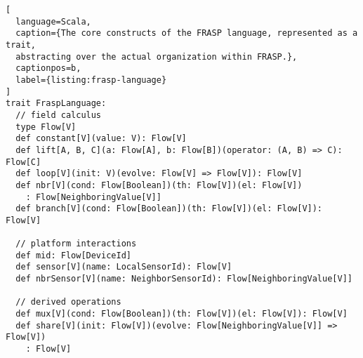 \begin{lstlisting}[
  language=Scala,
  caption={The core constructs of the FRASP language, represented as a trait,
  abstracting over the actual organization within FRASP.},
  captionpos=b,
  label={listing:frasp-language}
]
trait FraspLanguage:
  // field calculus
  type Flow[V]
  def constant[V](value: V): Flow[V]
  def lift[A, B, C](a: Flow[A], b: Flow[B])(operator: (A, B) => C): Flow[C]
  def loop[V](init: V)(evolve: Flow[V] => Flow[V]): Flow[V]
  def nbr[V](cond: Flow[Boolean])(th: Flow[V])(el: Flow[V])
    : Flow[NeighboringValue[V]]
  def branch[V](cond: Flow[Boolean])(th: Flow[V])(el: Flow[V]): Flow[V]

  // platform interactions
  def mid: Flow[DeviceId]
  def sensor[V](name: LocalSensorId): Flow[V]
  def nbrSensor[V](name: NeighborSensorId): Flow[NeighboringValue[V]]

  // derived operations
  def mux[V](cond: Flow[Boolean])(th: Flow[V])(el: Flow[V]): Flow[V]
  def share[V](init: Flow[V])(evolve: Flow[NeighboringValue[V]] => Flow[V])
    : Flow[V]
\end{lstlisting}

